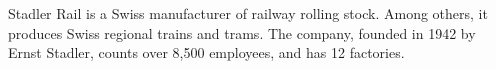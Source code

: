 Stadler Rail is a Swiss manufacturer of railway rolling stock.
Among others, it produces Swiss regional trains and trams.
The company, founded in 1942 by Ernst Stadler, counts over 8,500 employees, and has 12 factories.